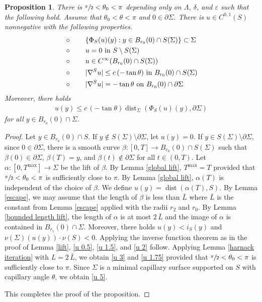 \documentclass[11pt]{amsart}
\newtheorem{prop}{Proposition}
\begin{document}
			\begin{prop} \label{graphicality 2}
		There is $\sfrac{\pi}2<\theta_0<\pi$  depending only on $\Lambda$, $\delta$, and $\varepsilon$ such that the following hold.
		Assume that $\theta_0<\theta<\pi$ and  $0\in \partial \Sigma$. There is  $ u\in C^{0,1}(S)$ nonnegative with the following properties.
			\begin{align}
				\label{u 0.5}	&\circ\qquad \{\Phi_S(u)(y):y\in  B_{r_0}(0)\cap S(\Sigma)\}\subset \Sigma\\ 
				\label{u 1.5}	&\circ\qquad \text{$u=0$ in $S\setminus S(\Sigma)$} \\ 
				\label{u 2}	&\circ\qquad \text{$ u\in C^\infty(B_{r_0}(0)\cap S(\Sigma))$}\\ 
				\label{u 3}	&\circ\qquad \text{$|\nabla^S u|\leq c\,(-\tan\theta)$ in $ B_{r_0}(0)\cap  S(\Sigma)$}\\ 
				\label{u 5}	&\circ\qquad \text{$|\nabla^S u|=-\tan\theta$ on $B_{r_0}(0)\cap \partial \Sigma $}
			\end{align}
			Moreover, there holds
			\begin{align}
				\label{u 1.75} 
				u(y)\leq c\,(-\tan\theta)\operatorname{dist}_\Sigma(\Phi_S(u)(y),\partial \Sigma)
			\end{align}
			for all $y \in B_{r_0}(0)\cap \Sigma$.
		\end{prop}
		\begin{proof}
Let $y\in B_{r_0}(0)\cap S$.	If $y\notin S(\Sigma)\setminus \partial \Sigma$, let $u(y)=0$. If $y\in S(\Sigma)\setminus \partial \Sigma$, since $0\in \partial \Sigma$, there is a smooth curve $\beta:[0, T]\to B_{r_0}(0)\cap S(\Sigma)$ such that $\beta(0)\in \partial \Sigma$, $\beta(T)=y$, and $\beta(t)\notin \partial \Sigma$ for all $t\in(0,T)$.  Let $\alpha:[0,T^{\max}]\to \Sigma$ be the lift of $\beta$. By  Lemma \ref{global lift}, $T^{\max}= T$ provided that $\sfrac{\pi}2<\theta_0<\pi$ is sufficiently close to $\pi$.  By  Lemma \ref{global lift}, $\alpha(T)$ is independent of the choice of $\beta$. We define $u(y)=\operatorname{dist}(\alpha(T),S)$. By Lemma \ref{escape}, we may assume that the length of $\beta$ is less than $\bar L$ where $\bar L$ is the constant from Lemma \ref{escape} applied with the radii $r_2$ and $r_0$. By  Lemma \ref{bounded length lift}, the length of $\alpha$ is at most $2\,\bar L$ and the image of $\alpha$ is contained in $B_{r_1}(0)\cap \Sigma$. Moreover, there holds $u(y)<i_S(y)$ and $\nu(\Sigma)(u(y))\cdot \nu(S)<0$. Applying the inverse function theorem as  in the proof of Lemma \ref{lift}, \eqref{u 0.5}, \eqref{u 1.5}, and \eqref{u 2} follow.  Applying Lemma \ref{harnack iteration} with $L=2\,\bar L$, we obtain \eqref{u 3} and \eqref{u 1.75} provided that $\sfrac{\pi}2<\theta_0<\pi$ is sufficiently close to $\pi$. Since $\Sigma$ is a minimal capillary surface supported on $S$ with capillary angle $\theta$, we obtain \eqref{u 5}.

This completes the proof of the proposition. 
		\end{proof}
	
\end{document}

